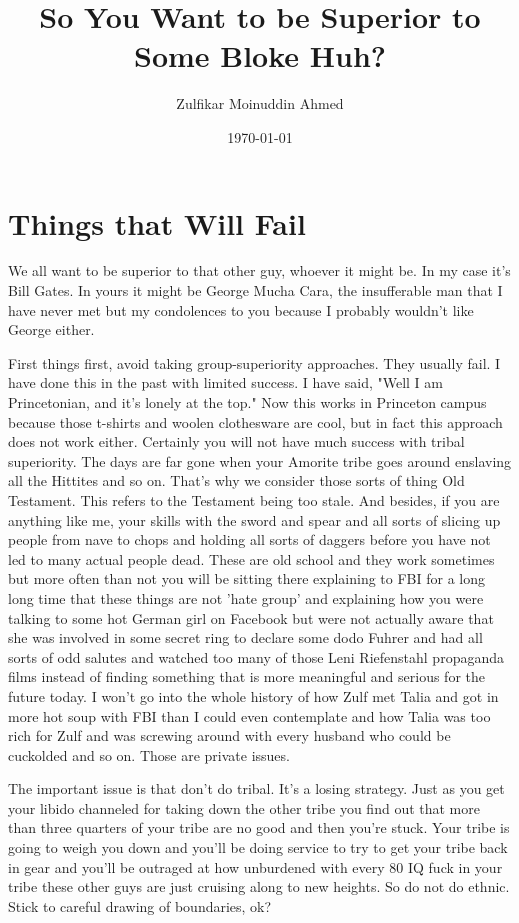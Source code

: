 \documentclass{amsart}
\title{So You Want to be Superior to Some Bloke Huh?}
\author{Zulfikar Moinuddin Ahmed}
\date{\today}
\begin{document}
\maketitle

\section{Things that Will Fail}

We all want to be superior to that other guy, whoever it might be.  In my case it's Bill Gates.  In yours it might be George Mucha Cara, the insufferable man that I have never met but my condolences to you because I probably wouldn't like George either.

First things first, avoid taking group-superiority approaches.  They usually fail.  I have done this in the past with limited success.  I have said, "Well I am Princetonian, and it's lonely at the top."  Now this works in Princeton campus because those t-shirts and woolen clothesware are cool, but in fact this approach does not work either.  Certainly you will not have much success with tribal superiority.  The days are far gone when your Amorite tribe goes around enslaving all the Hittites and so on.  That's why we consider those sorts of thing Old Testament.  This refers to the Testament being too stale.  And besides, if you are anything like me, your skills with the sword and spear and all sorts of slicing up people from nave to chops and holding all sorts of daggers before you have not led to many actual people dead.  These are old school and they work sometimes but more often than not you will be sitting there explaining to FBI for a long long time that these things are not 'hate group' and explaining how you were talking to some hot German girl on Facebook but were not actually aware that she was involved in some secret ring to declare some dodo Fuhrer and had all sorts of odd salutes and watched too many of those Leni Riefenstahl propaganda films instead of finding something that is more meaningful and serious for the future today.  I won't go into the whole history of how Zulf met Talia and got in more hot soup with FBI than I could even contemplate and how Talia was too rich for Zulf and was screwing around with every husband who could be cuckolded and so on.  Those are private issues.

The important issue is that don't do tribal.  It's a losing strategy.  Just as you get your libido channeled for taking down the other tribe you find out that more than three quarters of your tribe are no good and then you're stuck.  Your tribe is going to weigh you down and you'll be doing service to try to get your tribe back in gear and you'll be outraged at how unburdened with every 80 IQ fuck in your tribe these other guys are just cruising along to new heights.  So do not do ethnic.  Stick to careful drawing of boundaries, ok?
\end{document}

